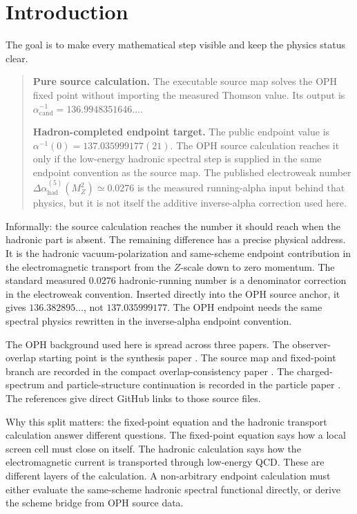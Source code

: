 \documentclass[11pt]{article}
\theoremstyle{remark}
\newcommand{\alphainv}{\alpha^{-1}}
\begin{document}
\section{Introduction}

The goal is to make every mathematical step visible and keep the physics status clear.

\begin{quote}\small
\textbf{Pure source calculation.} The executable source map solves the OPH fixed point without importing the measured Thomson value. Its output is \(\alphainv_{\mathrm{cand}}=136.9948351646\ldots\).

\textbf{Hadron-completed endpoint target.} The public endpoint value is \(\alphainv(0)=137.035999177(21)\). The OPH source calculation reaches it only if the low-energy hadronic spectral step is supplied in the same endpoint convention as the source map. The published electroweak number \(\Delta\alpha_{\mathrm{had}}^{(5)}(M_Z^2)\simeq0.0276\) is the measured running-alpha input behind that physics, but it is not itself the additive inverse-alpha correction used here.
\end{quote}

Informally: the source calculation reaches the number it should reach when the hadronic part is absent. The remaining difference has a precise physical address. It is the hadronic vacuum-polarization and same-scheme endpoint contribution in the electromagnetic transport from the \(Z\)-scale down to zero momentum. The standard measured \(0.0276\) hadronic-running number is a denominator correction in the electroweak convention. Inserted directly into the OPH source anchor, it gives \(136.382895\ldots\), not \(137.035999177\). The OPH endpoint needs the same spectral physics rewritten in the inverse-alpha endpoint convention.

The OPH background used here is spread across three papers. The observer-overlap starting point is the synthesis paper \cite{oph-synthesis}. The source map and fixed-point branch are recorded in the compact overlap-consistency paper \cite{oph-smgr}. The charged-spectrum and particle-structure continuation is recorded in the particle paper \cite{oph-particle}. The references give direct GitHub links to those source files.

Why this split matters: the fixed-point equation and the hadronic transport calculation answer different questions. The fixed-point equation says how a local screen cell must close on itself. The hadronic calculation says how the electromagnetic current is transported through low-energy QCD. These are different layers of the calculation. A non-arbitrary endpoint calculation must either evaluate the same-scheme hadronic spectral functional directly, or derive the scheme bridge from OPH source data.
\end{document}
